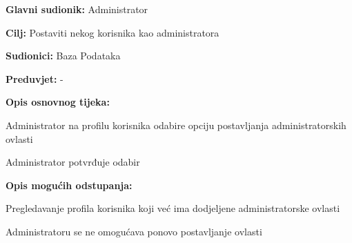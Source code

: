 		
			\noindent {}
			\begin{packed_item}
				
				\item \textbf{Glavni sudionik: }Administrator
				\item  \textbf{Cilj:} Postaviti nekog korisnika kao administratora 
				\item  \textbf{Sudionici:} Baza Podataka
				\item  \textbf{Preduvjet:} -
				\item  \textbf{Opis osnovnog tijeka:}
				
				\item[] \begin{packed_enum}
					
					\item Administrator na profilu korisnika odabire opciju postavljanja administratorskih ovlasti
					\item Administrator potvrđuje odabir
					
				\end{packed_enum}
				
				\item  \textbf{Opis mogućih odstupanja:}
				
				\item[] \begin{packed_item}
					
					\item[1.a] Pregledavanje profila korisnika koji već ima dodjeljene administratorske ovlasti
					\item[] \begin{packed_enum}
						
						\item Administratoru se ne omogućava ponovo postavljanje ovlasti
						
					\end{packed_enum}
					
				\end{packed_item}
			\end{packed_item}
		
